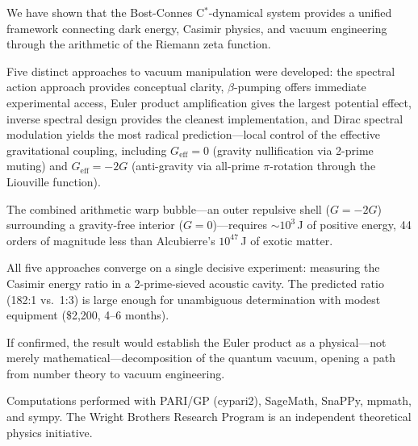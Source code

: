 \documentclass[aps,prd,twocolumn,superscriptaddress,nofootinbib]{revtex4-2}
\begin{document}
We have shown that the Bost-Connes C$^*$-dynamical system provides
a unified framework connecting dark energy, Casimir physics, and
vacuum engineering through the arithmetic of the Riemann zeta function.

Five distinct approaches to vacuum manipulation were developed:
the spectral action approach provides conceptual clarity,
$\beta$-pumping offers immediate experimental access,
Euler product amplification gives the largest potential effect,
inverse spectral design provides the cleanest implementation,
and Dirac spectral modulation yields the most radical prediction---local
control of the effective gravitational coupling, including
$G_{\mathrm{eff}} = 0$ (gravity nullification via 2-prime muting) and
$G_{\mathrm{eff}} = -2G$ (anti-gravity via all-prime $\pi$-rotation
through the Liouville function).

The combined arithmetic warp bubble---an outer repulsive shell
($G = -2G$) surrounding a gravity-free interior ($G = 0$)---requires
$\sim 10^3$\,J of positive energy, 44 orders of magnitude less than
Alcubierre's $10^{47}$\,J of exotic matter.

All five approaches converge on a single decisive experiment: measuring the
Casimir energy ratio in a 2-prime-sieved acoustic cavity.
The predicted ratio (182:1 vs.\ 1:3) is large enough for unambiguous
determination with modest equipment (\$2{,}200, 4--6 months).

If confirmed, the result would establish the Euler product as a
physical---not merely mathematical---decomposition of the quantum
vacuum, opening a path from number theory to vacuum engineering.

\begin{acknowledgments}
Computations performed with PARI/GP (cypari2), SageMath, SnaPPy,
mpmath, and sympy. The Wright Brothers Research Program is
an independent theoretical physics initiative.
\end{acknowledgments}
\end{document}
